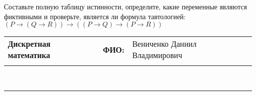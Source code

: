 \documentclass[10pt]{exam}
\newcommand{\class}{Дискретная математика}
\newcommand{\examdate}{}
\begin{document}
\begin{questions}
\begin{enumerate} [a)]
\end{enumerate}\question Составьте полную таблицу истинности, определите, какие переменные являются фиктивными и проверьте, является ли формула тавтологией:
$(P \rightarrow (Q \rightarrow R)) \rightarrow ((P \rightarrow Q) \rightarrow (P \rightarrow R))$

\end{questions}
\newpage
\begin{flushright}
\begin{tabular}{p{2.8in} r l}
\textbf{\class} & \textbf{ФИО:} &Вениченко Даниил Владимирович
\\

\textbf{\examdate} &&\\
\end{tabular}\\
\end{flushright}
\rule[1ex]{\textwidth}{.1pt}
\end{document}
